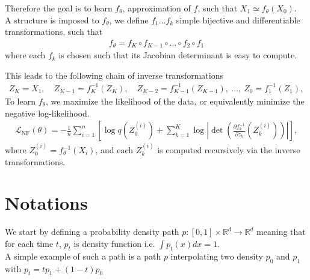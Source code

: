 \documentclass{article}
\begin{document}
Therefore the goal is to learn \(f_\theta\), approximation of \(f\), such that \(X_1 \simeq f_\theta(X_0)\). \\
A structure is imposed to $f_\theta$, we define $f_1\ldots f_k$ simple bijective and differentiable transformations,  such that
\begin{align}
    f_\theta = f_K\circ f_{K-1}\circ\ldots\circ f_2\circ f_1
\end{align}
where each \( f_k \) is chosen such that its Jacobian determinant is easy to compute.

\begin{comment}
There is then, 
\begin{align}
    X_0\sim p_0=q, \quad f_1(X_0) = X_1 \implies X_1\sim p_1,\quad f(X_1)=X_2 \ldots f(X_{k-1})=X_k \sim p_k = \hat{p} \simeq p
\end{align}
\end{comment}
This leads to the following chain of inverse transformations
\begin{align}
    Z_K = X_1,\quad Z_{K-1} = f_K^{-1}(Z_K),\quad Z_{K-2} = f_{K-1}^{-1}(Z_{K-1}),\ \dots,\ Z_0 = f_1^{-1}(Z_1),
\end{align}
To learn \(f_\theta\), we maximize the likelihood of the data, or equivalently minimize the negative log-likelihood.
\begin{align}
    \mathcal{L}_\text{NF}(\theta) 
    = -\frac{1}{n} \sum_{i=1}^n \left[ \log q(Z_0^{(i)}) + \sum_{k=1}^K \log \left| \det \left( \frac{\partial f_k^{-1}}{\partial z_{k}}(Z_k^{(i)}) \right) \right| \right],
\end{align}
where \( Z_0^{(i)} = f_\theta^{-1}(X_i) \), and each \( Z_k^{(i)} \) is computed recursively via the inverse transformations.


\section{Notations}
We start by defining a probability density path \(p:[0,1]\times\mathbb{R}^d\rightarrow\mathbb{R}^d\) meaning that for each time \(t\), \(p_t\) is density function i.e. \(\int p_t(x)dx=1\).\\
A simple example of such a path is a path \(p\) interpolating two density \(p_0\) and \(p_1\) with \(p_t=tp_1+(1-t)p_0\)
\end{document}
